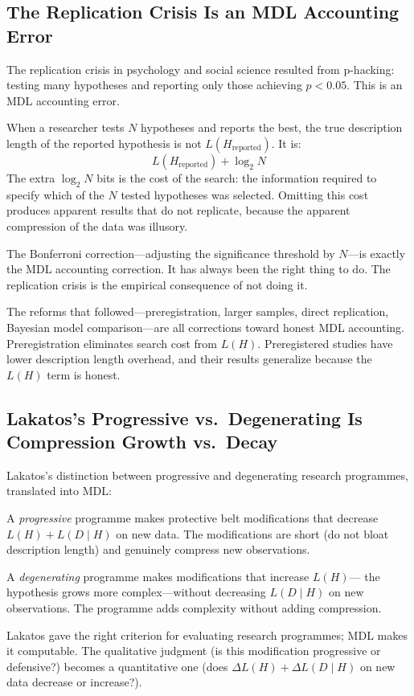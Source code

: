 \subsection{The Replication Crisis Is an MDL Accounting Error}

The replication crisis in psychology and social science resulted from
p-hacking: testing many hypotheses and reporting only those achieving
$p < 0.05$. This is an MDL accounting error.

When a researcher tests $N$ hypotheses and reports the best, the true
description length of the reported hypothesis is not $L(H_{\text{reported}})$.
It is:
\[
  L(H_{\text{reported}}) + \log_2 N
\]
The extra $\log_2 N$ bits is the cost of the search: the information required
to specify which of the $N$ tested hypotheses was selected. Omitting this cost
produces apparent results that do not replicate, because the apparent
compression of the data was illusory.

The Bonferroni correction---adjusting the significance threshold by $N$---is
exactly the MDL accounting correction. It has always been the right thing to
do. The replication crisis is the empirical consequence of not doing it.

The reforms that followed---preregistration, larger samples, direct
replication, Bayesian model comparison---are all corrections toward honest
MDL accounting. Preregistration eliminates search cost from $L(H)$.
Preregistered studies have lower description length overhead, and their
results generalize because the $L(H)$ term is honest.

\subsection{Lakatos's Progressive vs.\ Degenerating Is Compression Growth vs.\ Decay}

Lakatos's distinction between progressive and degenerating research
programmes, translated into MDL:

A \emph{progressive} programme makes protective belt modifications that
decrease $L(H) + L(D \mid H)$ on new data. The modifications are short
(do not bloat description length) and genuinely compress new observations.

A \emph{degenerating} programme makes modifications that increase $L(H)$---
the hypothesis grows more complex---without decreasing $L(D \mid H)$ on new
observations. The programme adds complexity without adding compression.

Lakatos gave the right criterion for evaluating research programmes; MDL
makes it computable. The qualitative judgment (is this modification
progressive or defensive?) becomes a quantitative one (does
$\Delta L(H) + \Delta L(D \mid H)$ on new data decrease or increase?).


